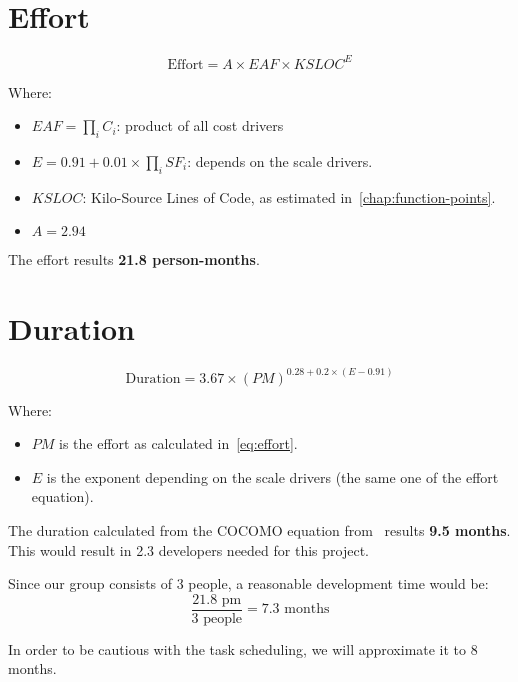 \section{Effort}

\begin{equation}
    \textrm{Effort} = A \times EAF \times KSLOC^E
    \label{eq:effort}
\end{equation}

Where:
\begin{itemize}
    \item $EAF = \prod_i C_i$: product of all cost drivers
    \item $E=0.91 + 0.01 \times \prod_{i}SF_i$: depends on the scale drivers.
    \item $KSLOC$: Kilo-Source Lines of Code, as estimated in~\autoref{chap:function-points}.
    \item $A=2.94$
\end{itemize}

The effort results \textbf{21.8 person-months}.

\section{Duration}

\begin{equation}
    \textrm{Duration} = 3.67 \times (PM)^{0.28 + 0.2 \times (E-0.91)}
    \label{eq:duration}
\end{equation}

Where:
\begin{itemize}
    \item $PM$ is the effort as calculated in~\autoref{eq:effort}.
    \item $E$ is the exponent depending on the scale drivers (the same one of the effort equation).
\end{itemize}

The duration calculated from the COCOMO equation from~\cite{cocomo-manual} results \textbf{9.5 months}.
This would result in 2.3 developers needed for this project.

Since our group consists of 3 people, a reasonable development time would be:
\[
    \frac{21.8\textrm{ pm}}{3 \textrm{ people}}=7.3\textrm{ months}
\]

In order to be cautious with the task scheduling, we will approximate it to 8 months.
